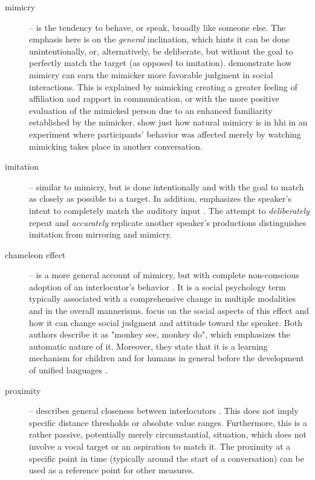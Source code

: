 \begin{description}
	\item[mimicry] -- is the tendency to behave, or speak, broadly like someone else.
	The emphasis here is on the \emph{general} inclination, which hints it can be done unintentionally, or, alternatively, be deliberate, but without the goal to perfectly match the target (as opposed to imitation).
	\citet{Gueguen2009mimicry} demonstrate how mimicry can earn the mimicker more favorable judgment in social interactions.
	This is explained by mimicking creating a greater feeling of affiliation and rapport in communication, or with the more positive evaluation of the mimicked person due to an enhanced familiarity established by the mimicker.
	\citet{Parrill2006seeing} show just how natural mimicry is in \ac{hhi} in an experiment where participants' behavior was affected merely by watching mimicking takes place in another conversation.
	
	\item[imitation] -- similar to mimicry, but is done intentionally and with the goal to match as closely as possible to a target.
	In addition, emphasizes the speaker's intent to completely match the auditory input \citep[cf.][]{Gueguen2009mimicry}.
	The attempt to \emph{deliberately} repeat and \emph{accurately} replicate another speaker's productions distinguishes imitation from mirroring and mimicry.
	
	\item[chameleon effect] -- is a more general account of mimicry, but with complete non-conscious adoption of an interlocutor's behavior \citep{Chartrand1999chameleon}.
	It is a social psychology term typically associated with a comprehensive change in multiple modalities and in the overall mannerisms.
	\citet{Gueguen2009mimicry} focus on the social aspects of this effect and how it can change social judgment and attitude toward the speaker.
	Both authors describe it as "monkey see, monkey do", which emphasizes the automatic nature of it.
	Moreover, they state that it is a learning mechanism for children and for humans in general before the development of unified languages \citet[][p.\ 256]{Gueguen2009mimicry}.
	
	\item[proximity] -- describes general closeness between interlocutors \citep[as illustrated in Figure 1 in][]{Levitan2011measuring}.
	This does not imply specific distance thresholds or absolute value ranges.
	Furthermore, this is a rather passive, potentially merely circumstantial, situation, which does not involve a vocal target or an aspiration to match it.
	The proximity at a specific point in time (typically around the start of a conversation) can be used as a reference point for other measures.
	

\end{description}
